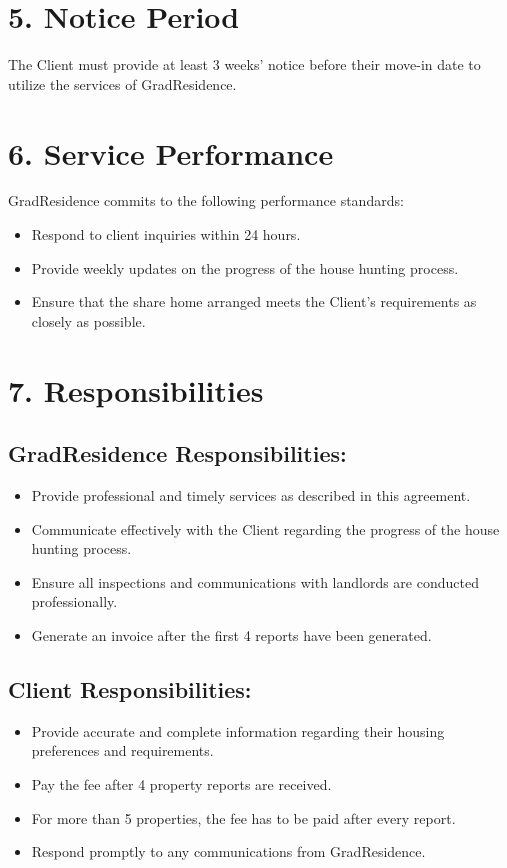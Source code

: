 \documentclass[a4paper,12pt]{article}
\begin{document}
\section*{5. Notice Period}
The Client must provide at least 3 weeks' notice before their move-in date to utilize the services of GradResidence.

\section*{6. Service Performance}
GradResidence commits to the following performance standards:
\begin{itemize}
    \item Respond to client inquiries within 24 hours.
    \item Provide weekly updates on the progress of the house hunting process.
    \item Ensure that the share home arranged meets the Client's requirements as closely as possible.
\end{itemize}

\section*{7. Responsibilities}
\subsection*{GradResidence Responsibilities:}
\begin{itemize}
    \item Provide professional and timely services as described in this agreement.
    \item Communicate effectively with the Client regarding the progress of the house hunting process.
    \item Ensure all inspections and communications with landlords are conducted professionally.
    \item Generate an invoice after the first 4 reports have been generated.
\end{itemize}

\subsection*{Client Responsibilities:}
\begin{itemize}
    \item Provide accurate and complete information regarding their housing preferences and requirements.
    \item Pay the fee after 4 property reports are received.
    \item For more than 5 properties, the fee has to be paid after every report.
    \item Respond promptly to any communications from GradResidence.
\end{itemize}
\end{document}
